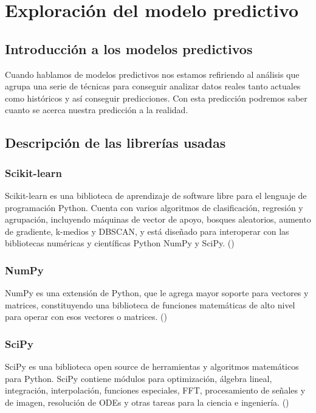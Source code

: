 \cleardoublepage

\chapter{Exploración del modelo predictivo}
\label{makereference4}

\section{Introducción a los modelos predictivos}
\label{makereference4.1}

Cuando hablamos de modelos predictivos nos estamos refiriendo al análisis que agrupa una serie de técnicas para conseguir analizar datos reales tanto actuales como históricos y así conseguir predicciones. Con esta predicción podremos saber cuanto se acerca nuestra predicción a la realidad.

\section{Descripción de las librerías usadas}
\label{makereference4.2}
	\subsection{Scikit-learn}
	\label{makereference4.2.1}
	Scikit-learn es una biblioteca de aprendizaje de software libre para el lenguaje de programación Python. Cuenta con varios algoritmos de clasificación, regresión y agrupación, incluyendo máquinas de vector de apoyo, bosques aleatorios, aumento de gradiente, k-medios y DBSCAN, y está diseñado para interoperar con las bibliotecas numéricas y científicas Python NumPy y SciPy. (\cite{ARP:Scikit:2017})
	
	\subsection{NumPy}
	\label{makereference4.2.2}
	NumPy es una extensión de Python, que le agrega mayor soporte para vectores y matrices, constituyendo una biblioteca de funciones matemáticas de alto nivel para operar con esos vectores o matrices. (\cite{ARP:Numpy:2017})
	
	\subsection{SciPy}
	\label{makereference4.2.3}
	SciPy es una biblioteca open source de herramientas y algoritmos matemáticos para Python. SciPy contiene módulos para optimización, álgebra lineal, integración, interpolación, funciones especiales, FFT, procesamiento de señales y de imagen, resolución de ODEs y otras tareas para la ciencia e ingeniería. (\cite{ARP:Scipy:2017})
	
